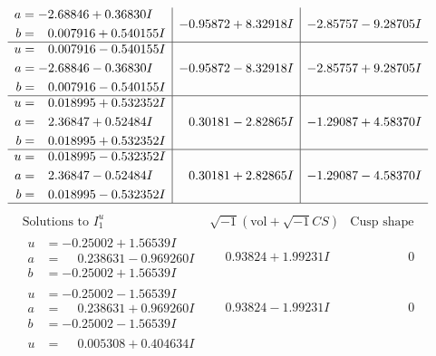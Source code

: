 \documentclass[1p]{elsarticle_modified}
\theoremstyle{definition}
\newcommand{\I}{\sqrt{-1}}
\begin{document}
$$\begin{array}{c|c|c}
\begin{aligned}
a &= -2.68846 + 0.36830 I \\
b &= \phantom{-}0.007916 + 0.540155 I\end{aligned}
 & -0.95872 + 8.32918 I & -2.85757 - 9.28705 I \\ \hline\begin{aligned}
u &= \phantom{-}0.007916 - 0.540155 I \\
a &= -2.68846 - 0.36830 I \\
b &= \phantom{-}0.007916 - 0.540155 I\end{aligned}
 & -0.95872 - 8.32918 I & -2.85757 + 9.28705 I \\ \hline\begin{aligned}
u &= \phantom{-}0.018995 + 0.532352 I \\
a &= \phantom{-}2.36847 + 0.52484 I \\
b &= \phantom{-}0.018995 + 0.532352 I\end{aligned}
 & \phantom{-}0.30181 - 2.82865 I & -1.29087 + 4.58370 I \\ \hline\begin{aligned}
u &= \phantom{-}0.018995 - 0.532352 I \\
a &= \phantom{-}2.36847 - 0.52484 I \\
b &= \phantom{-}0.018995 - 0.532352 I\end{aligned}
 & \phantom{-}0.30181 + 2.82865 I & -1.29087 - 4.58370 I\\
 \hline 
 \end{array}$$\newpage$$\begin{array}{c|c|c}  
\text{Solutions to }I^u_{1}& \I (\text{vol} + \sqrt{-1}CS) & \text{Cusp shape}\\
 \hline 
\begin{aligned}
u &= -0.25002 + 1.56539 I \\
a &= \phantom{-}0.238631 - 0.969260 I \\
b &= -0.25002 + 1.56539 I\end{aligned}
 & \phantom{-}0.93824 + 1.99231 I & \phantom{-0.000000 } 0 \\ \hline\begin{aligned}
u &= -0.25002 - 1.56539 I \\
a &= \phantom{-}0.238631 + 0.969260 I \\
b &= -0.25002 - 1.56539 I\end{aligned}
 & \phantom{-}0.93824 - 1.99231 I & \phantom{-0.000000 } 0 \\ \hline\begin{aligned}
u &= \phantom{-}0.005308 + 0.404634 I \\

\end{aligned}
\end{array}$$
\end{document}
